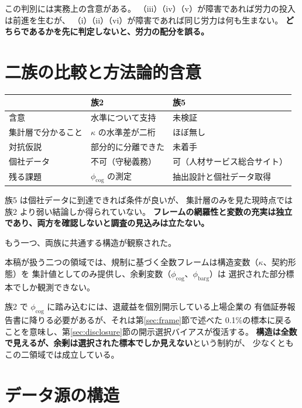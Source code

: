 この判別には実務上の含意がある。
（iii）（iv）（v）が障害であれば労力の投入は前進を生むが、
（i）（ii）（vi）が障害であれば同じ労力は何も生まない。
\textbf{どちらであるかを先に判定しないと、労力の配分を誤る。}


\section{二族の比較と方法論的含意}

\begin{center}
\begin{tabularx}{\textwidth}{@{}lXX@{}}
\toprule
 & 族2 & 族5 \\
\midrule
含意 & 水準について支持 & 未検証 \\
集計層で分かること & $\kappa$ の水準差が二桁 & ほぼ無し \\
対抗仮説 & 部分的に分離できた & 未着手 \\
個社データ & 不可（守秘義務） & 可（人材サービス総合サイト） \\
残る課題 & $\phi_{\mathrm{cog}}$ の測定 & 抽出設計と個社データ取得 \\
\bottomrule
\end{tabularx}
\label{tab:family2-5-comparison}
\end{center}

族5 は個社データに到達できれば条件が良いが、
集計層のみを見た現時点では族2 より弱い結論しか得られていない。
\textbf{フレームの網羅性と変数の充実は独立であり、両方を確認しないと調査の見込みは立たない。}

もう一つ、両族に共通する構造が観察された。

\begin{proposition}[集計層と個社層のトレードオフ]
本稿が扱う二つの領域では、規制に基づく全数フレームは構造変数（$\kappa$、契約形態）を
集計値としてのみ提供し、余剰変数（$\phi_{\mathrm{cog}}$、$\phi_{\mathrm{barg}}$）は
選択された部分標本でしか観測できない。
\end{proposition}

族2 で $\phi_{\mathrm{cog}}$ に踏み込むには、退蔵益を個別開示している上場企業の
有価証券報告書に降りる必要があるが、それは第\ref{sec:frame}節で述べた
0.1\%の標本に戻ることを意味し、第\ref{sec:disclosure}節の開示選択バイアスが復活する。
\textbf{構造は全数で見えるが、余剰は選択された標本でしか見えない}という制約が、
少なくともこの二領域では成立している。

\section{データ源の構造}
\label{sec:pilot}

